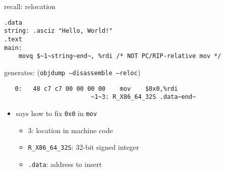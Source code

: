\begin{frame}[fragile,label=reloc]{recall: relocation}
\begin{lstlisting}
.data
string: .asciz "Hello, World!"
.text
main:
    movq $~1~string~end~, %rdi /* NOT PC/RIP-relative mov */
\end{lstlisting}
    generates: (\texttt{objdump --disassemble --reloc})
\begin{lstlisting}
   0:   48 c7 c7 00 00 00 00    mov    $0x0,%rdi
                        ~1~3: R_X86_64_32S .data~end~
\end{lstlisting}
    \begin{itemize}
        \item {} says how to fix \texttt{0x0} in \texttt{mov}
            \begin{itemize}
                \item 3: location in machine code
                \item \texttt{R\_X86\_64\_32S}: 32-bit signed integer
                \item \texttt{.data}: address to insert
            \end{itemize}
    \end{itemize}
\end{frame}

